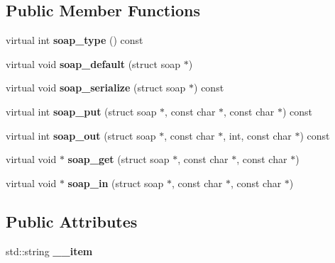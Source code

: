 \subsection*{Public Member Functions}
\begin{DoxyCompactItemize}
\item 
\hypertarget{classxsd____string_acb04a18eaf08ee2ba937f6e2f547fa86}{
virtual int {\bfseries soap\_\-type} () const }
\label{classxsd____string_acb04a18eaf08ee2ba937f6e2f547fa86}

\item 
\hypertarget{classxsd____string_a40bc25b644c49a65eca02aa3a40d518e}{
virtual void {\bfseries soap\_\-default} (struct soap $\ast$)}
\label{classxsd____string_a40bc25b644c49a65eca02aa3a40d518e}

\item 
\hypertarget{classxsd____string_a1cfe7cdad30cf8288a1dc39b88708e9f}{
virtual void {\bfseries soap\_\-serialize} (struct soap $\ast$) const }
\label{classxsd____string_a1cfe7cdad30cf8288a1dc39b88708e9f}

\item 
\hypertarget{classxsd____string_a4d6568f84f9cd0d5578c7cc2054ba258}{
virtual int {\bfseries soap\_\-put} (struct soap $\ast$, const char $\ast$, const char $\ast$) const }
\label{classxsd____string_a4d6568f84f9cd0d5578c7cc2054ba258}

\item 
\hypertarget{classxsd____string_a8ebd4cc92e3c035f60ce6e0e7adf736b}{
virtual int {\bfseries soap\_\-out} (struct soap $\ast$, const char $\ast$, int, const char $\ast$) const }
\label{classxsd____string_a8ebd4cc92e3c035f60ce6e0e7adf736b}

\item 
\hypertarget{classxsd____string_afdd507f18918e20e371be428d61d577a}{
virtual void $\ast$ {\bfseries soap\_\-get} (struct soap $\ast$, const char $\ast$, const char $\ast$)}
\label{classxsd____string_afdd507f18918e20e371be428d61d577a}

\item 
\hypertarget{classxsd____string_aff6e7acb402ac4416ad277605956cde5}{
virtual void $\ast$ {\bfseries soap\_\-in} (struct soap $\ast$, const char $\ast$, const char $\ast$)}
\label{classxsd____string_aff6e7acb402ac4416ad277605956cde5}

\end{DoxyCompactItemize}
\subsection*{Public Attributes}
\begin{DoxyCompactItemize}
\item 
\hypertarget{classxsd____string_a9750dab70093c29d28bedf9ff9af4e5e}{
std::string {\bfseries \_\-\_\-item}}
\label{classxsd____string_a9750dab70093c29d28bedf9ff9af4e5e}

\end{DoxyCompactItemize}


